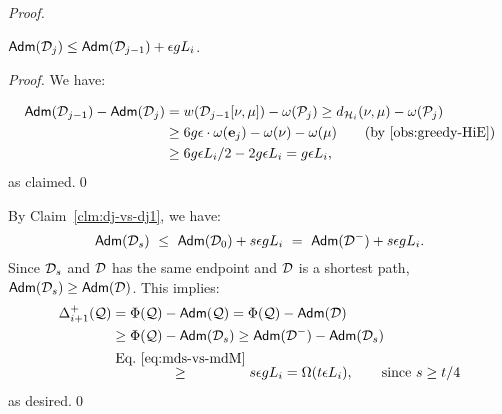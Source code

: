 \begin{proof}
\begin{claim}\label{clm:dj-vs-dj1}
	$\mathsf{Adm}(\mathcal{D}_j) \leq \mathsf{Adm}(\mathcal{D}_{j-1}) + \epsilon g L_i$.
\end{claim}
\begin{proof}
	We have: 
	
	\begin{equation*}
		\begin{split}
			\adm(\md_{j-1}) - \adm(\md_j) &= w(\md_{j-1}[\nu,\mu]) - \omega(\mp_j) \geq  d_{\mathcal{H}_i}(\nu,\mu) - \omega(\mp_j) \\
			&\geq 6g\epsilon  \cdot \omega(\mbe_j)  - \omega(\nu) - \omega(\mu) \qquad \mbox{(by \Cref{obs:greedy-HiE})} \\
			&\geq 6g\epsilon L_i/2 - 2g\epsilon L_i = g\epsilon L_i,
		\end{split}
	\end{equation*}
	as claimed.\qed
\end{proof}


By Claim~\ref{clm:dj-vs-dj1}, we have:
\begin{equation}\label{eq:mds-vs-mdM}
	\mathsf{Adm}(\mathcal{D}_s) ~\leq~ \mathsf{Adm}(\mathcal{D}_0) + s\epsilon g L_i ~=~ \mathsf{Adm}(\mathcal{D}^-) + s\epsilon g L_i.
\end{equation}
Since $\mathcal{D}_s$ and $\mathcal{D}$ has the same endpoint and $\mathcal{D}$ is a shortest path, $\mathsf{Adm}(\mathcal{D}_s)\geq \mathsf{Adm}(\mathcal{D})$.  This implies:
\begin{equation*}
	\begin{split}
		\Delta^+_{i+1}(\mathcal{Q}) &= \Phi(\mathcal{Q}) - \mathsf{Adm}(\mathcal{Q}) =  \Phi(\mathcal{Q}) - \mathsf{Adm}(\mathcal{D})\\
		&\geq \Phi(\mathcal{Q})  - \mathsf{Adm}(\mathcal{D}_s) \geq \mathsf{Adm}(\mathcal{D}^-) - \mathsf{Adm}(\mathcal{D}_s)\\
		&\stackrel{\mbox{Eq.~\eqref{eq:mds-vs-mdM}}}{\geq} s\epsilon g L_i = \Omega(t\epsilon L_i),\qquad \mbox{since }s\geq t/4 
	\end{split}
\end{equation*}
as desired.\qed		
\end{proof}


